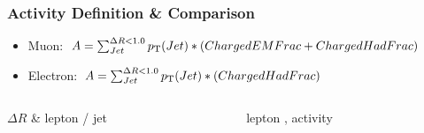 \documentclass{beamer}
\begin{document}
\begin{frame}
 \frametitle{Activity Definition \& Comparison}
  \begin{itemize}
  \item Muon: $A = \sum_{Jet}^{\Delta R<1.0} \pt(Jet) * (ChargedEMFrac + ChargedHadFrac) $
    \item Electron: $A = \sum_{Jet}^{\Delta R<1.0} \pt(Jet) * (ChargedHadFrac) $
  \end{itemize}
\begin{columns}
  \begin{column}{0.5\textwidth}
  \centering
   \small $\Delta R$ \& lepton \pt / jet \pt
{}  
  \end{column}
  \begin{column}{0.5\textwidth}
  \centering
      \small  lepton \pt, activity
\begin{tikzpicture}

\end{tikzpicture}
\end{column}
\end{columns}
\end{frame}
\end{document}
